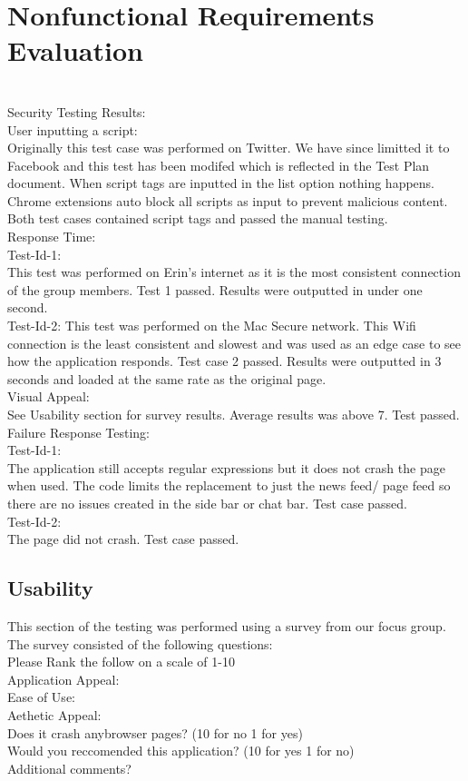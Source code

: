 \documentclass[12pt, titlepage]{article}
\begin{document}
\section{Nonfunctional Requirements Evaluation}
\\
Security Testing Results:
\\
User inputting a script:
\\
Originally this test case was performed on Twitter. We have since limitted it to Facebook and this test has been modifed which is reflected in the Test Plan document. When script tags are inputted in the list option nothing happens. Chrome extensions auto block all scripts as input to prevent malicious content. Both test cases contained script tags and passed the manual testing.
\\
Response Time:
\\
Test-Id-1: \\
This test was performed on Erin's internet as it is the most consistent connection of the group members. Test 1 passed. Results were outputted in under one second. \\
Test-Id-2: This test was performed on the Mac Secure network. This Wifi connection is the least consistent and slowest and was used as an edge case to see how the application responds. Test case 2 passed. Results were outputted in 3 seconds and loaded at the same rate as the original page.\\
Visual Appeal: \\
See Usability section for survey results. Average results was above 7. Test passed. \\
Failure Response Testing: \\
Test-Id-1: \\
The application still accepts regular expressions but it does not crash the page when used. The code limits the replacement to just the news feed/ page feed so there are no issues created in the side bar or chat bar. Test case passed. \\
Test-Id-2:\\
The page did not crash. Test case passed.

\subsection{Usability}
This section of the testing was performed using a survey from our focus group. The survey consisted of the following questions: \\
Please Rank the follow on a scale of 1-10 \\
Application Appeal:  \\
Ease of Use:\\
Aethetic Appeal: \\
Does it crash anybrowser pages? (10 for no 1 for yes) \\
Would you reccomended this application? (10 for yes 1 for no) \\
Additional comments? \\
\end{document}
